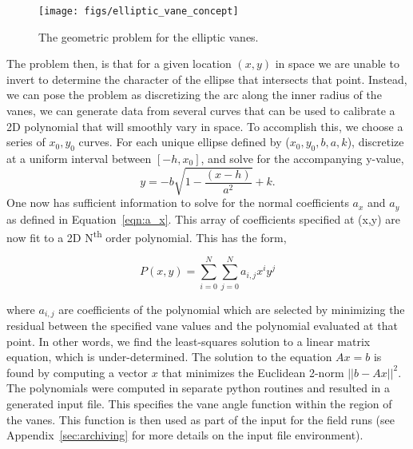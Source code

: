  \begin{figure}[!htb]
  \begin{center}
   \texttt{[image: figs/elliptic\_vane\_concept]}
   \caption{The geometric problem for the elliptic vanes.}
   \label{fig:elliptic_vane_concept}
  \end{center}
 \end{figure}

The problem then, is that for a given location $(x,y)$ in space we are
unable to invert to determine the character of the ellipse that
intersects that point. Instead, we can pose the problem as discretizing
the arc along the inner radius of the vanes, we can generate data from
several curves that can be used to calibrate a 2D polynomial that will
smoothly vary in space. To accomplish this, we choose a series of
$x_0,y_0$ curves. For each unique ellipse defined by ($x_0,y_0,b,a,k$),
discretize at a uniform interval between $\left[-h,x_0\right]$, and
solve for the accompanying y-value, 
\begin{equation}
 y = -b \sqrt{1-\frac{(x-h)}{a^2}} + k. 
\end{equation}
One now has sufficient information to solve for the normal coefficients
$a_x$ and $a_y$ as defined in Equation~\ref{eqn:a_x}. This array of
coefficients specified at (x,y) are now fit to a 2D N\textsuperscript{th}
order polynomial. This has the form, 

\begin{equation}
 P(x,y) = \sum_{i=0}^N  \sum_{j=0}^N a_{i,j} x^i y^j
\end{equation}

where $a_{i,j}$ are coefficients of the polynomial which are selected by
minimizing the residual between the specified vane values and the
polynomial evaluated at that point. In other words, we find the
least-squares solution to a linear matrix equation, which is
under-determined. The solution to the equation $A x = b$ is found by
computing a vector $x$ that minimizes the Euclidean 2-norm $|| b - A x
||^2$. The polynomials were computed in separate python routines and
resulted in a generated input file. This specifies the vane angle
function within the region of the vanes. This function is then used as
part of the input for the field runs (see Appendix~\ref{sec:archiving}
for more details on the input file environment). 
%
%


